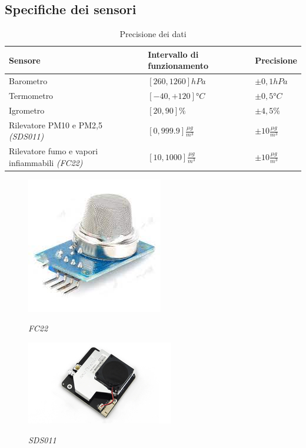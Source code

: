 \documentclass[12pt, a4paper]{article}
\begin{document}
	\subsection{Specifiche dei sensori}
	\begin{table}[H]
	\caption{Precisione dei dati}
	\begin{tabular}{|l|l|l|}
	\hline
	Sensore & Intervallo di funzionamento & Precisione\\
	\hline
	\hline
	Barometro & $[260,1260]hPa$ & $\pm0,1hPa$\\
	\hline
	Termometro & $[-40,+120]°C$ & $\pm 0,5 °C$\\
	\hline
	Igrometro & $[20,90]\%$ & $\pm 4,5\%$\\
	\hline
	Rilevatore PM10 e PM2,5 \emph{(SDS011)}& $[0,999.9]\frac{\mu g}{m^3}$ & $\pm 10\frac{\mu g}{m^3}$\\
	\hline
	Rilevatore fumo e vapori infiammabili \emph{(FC22)} &$[10,1000]\frac{\mu g}{m^3}$ & $\pm 10\frac{\mu g}{m^3}$\\
	\hline
	\end{tabular}
	\end{table}
	\clearpage
	\begin{figure}[H]
		\centering
		\includegraphics[]{FC22.png}\\
		\caption{\emph{FC22}}
		\label{fig:fc22}
	\end{figure}
	\begin{figure}[H]
		\centering
		\includegraphics[]{sds011.jpg}\\
		\caption{\emph{SDS011}}
		\label{fig:sds011}
	\end{figure}
\end{document}
